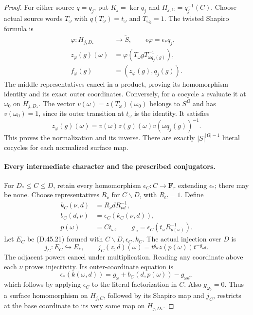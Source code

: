 \begin{proof}
For either source \(q=q_j\), put
\(K_j=\ker q_j\) and \(H_{j,C}=q_j^{-1}(C)\).
Choose actual source words \(T_\omega\) with
\(q(T_\omega)=t_\omega\) and \(T_{\omega_0}=1\).
The twisted Shapiro formula is
\[
 \begin{split}
 \varphi:H_{j,D_*}&\longrightarrow\widetilde S,
                   \qquad \epsilon\varphi=\epsilon_*q_j,\\
 z_\varphi(g)(\omega)
    &=\varphi(T_\omega gT_{\omega q_j(g)}^{-1}),\\
 f_\varphi(g)&=(z_\varphi(g),q_j(g)).
 \end{split}
 \tag{D.45.22}
\]
The middle representatives cancel in a product,
proving its homomorphism identity and its exact
outer coordinates.
Conversely, for a cocycle \(z\) evaluate it at
\(\omega_0\) on \(H_{j,D_*}\).
The vector
\(v(\omega)=z(T_\omega)(\omega_0)\) belongs to
\(S^\Omega\) and has \(v(\omega_0)=1\), since its
outer transition at \(t_\omega\) is the identity.
It satisfies
\[
          z_\varphi(g)(\omega)
             =v(\omega)z(g)(\omega)v(\omega q_j(g))^{-1}.
 \tag{D.45.23}
\]
This proves the normalization and its inverse.
There are exactly \(|S|^{|\Omega|-1}\) literal
cocycles for each normalized surface map.

\paragraph{Every intermediate character and the prescribed conjugators.}
For \(D_*\leq C\leq D\), retain every homomorphism
\(\epsilon_C:C\to\mathbf F_r\) extending
\(\epsilon_*\); there may be none.
Choose representatives \(R_\nu\) for \(C\backslash D\),
with \(R_{C}=1\). Define
\[
 \begin{split}
 k_C(\nu,d)&=R_\nu dR_{\nu d}^{-1},\\
 b_C(d,\nu)&=\epsilon_C(k_C(\nu,d)),\\
 p(\omega)&=Ct_\omega,\qquad
 g_\omega=\epsilon_C(t_\omega R_{p(\omega)}^{-1}).
 \end{split}
 \tag{D.45.24}
\]
Let \(E_C\) be \textup{(D.45.21)} formed with
\(C\backslash D,\epsilon_C,k_C\).
The actual injection over \(D\) is
\[
 j_C:E_C\hookrightarrow E_*,
 \qquad
 j_C(z,d)(\omega)
       =t^{g_\omega}z(p(\omega))t^{-g_{\omega d}} .
 \tag{D.45.25}
\]
The adjacent powers cancel under multiplication.
Reading any coordinate above each \(\nu\) proves
injectivity. Its outer-coordinate equation is
\[
 \epsilon_*(k(\omega,d))
       =g_\omega+b_C(d,p(\omega))-g_{\omega d},
 \tag{D.45.26}
\]
which follows by applying \(\epsilon_C\) to the
literal factorization in \(C\).
Also \(g_{\omega_0}=0\).
Thus a surface homomorphism on \(H_{j,C}\),
followed by its Shapiro map and \(j_C\), restricts
at the base coordinate to its very same map on
\(H_{j,D_*}\).


\end{proof}
